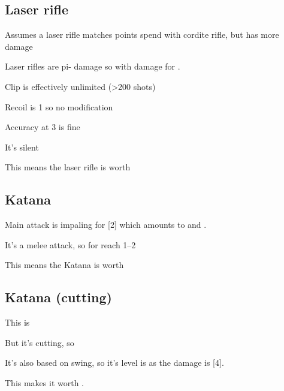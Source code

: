 \subsection{Laser rifle}
\label{sec:laser-rifle}

Assumes a laser rifle matches points spend with cordite rifle, but has more damage

\begin{innateattack}
  \item Laser rifles are pi- damage so  with
     damage for .
  \item Clip is effectively unlimited (>200 shots)
  \item Recoil is 1 so no modification
  \item Accuracy at 3 is fine
  \item It's silent
  \item This means the laser rifle is worth \InnateAttackTotalPoints{}
\end{innateattack}

\subsection{Katana}
\label{sec:katana}

\begin{innateattack}[katana]
  \item Main attack is impaling for [2] which amounts to
     and .
  \item It's a melee attack, so  for reach 1--2
  \item This means the Katana is worth \InnateAttackTotalPoints{}
\end{innateattack}
\begin{center}
  \InnateAttackBreakdown
\end{center}

\subsection{Katana (cutting)}
\label{sec:katana-cutting}

\begin{innateattack}
\item This is 
\item But it's cutting, so 
\item It's also based on swing, so it's level is  as the
  damage is [4].
  \item This makes it worth \InnateAttackTotalPoints{}.
\end{innateattack}
\begin{center}
  \InnateAttackBreakdown
\end{center}

